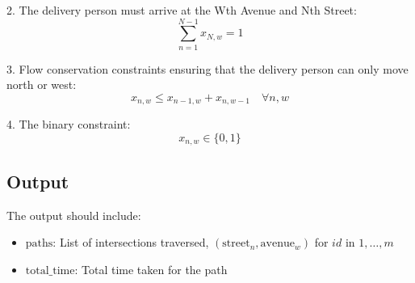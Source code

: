 \documentclass{article}
\begin{document}
2. The delivery person must arrive at the Wth Avenue and Nth Street:
   \[
   \sum_{n=1}^{N-1} x_{N,w} = 1
   \]

3. Flow conservation constraints ensuring that the delivery person can only move north or west:
   \[
   x_{n,w} \leq x_{n-1,w} + x_{n,w-1} \quad \forall n, w
   \]

4. The binary constraint:
   \[
   x_{n,w} \in \{0, 1\}
   \]

\subsection*{Output}
The output should include:
\begin{itemize}
    \item \( \text{paths} \): List of intersections traversed, \( \left( \text{street}_n, \text{avenue}_w \right) \) for \( id \) in \( 1, \ldots, m \)
    \item \( \text{total\_time} \): Total time taken for the path
\end{itemize}
\end{document}
